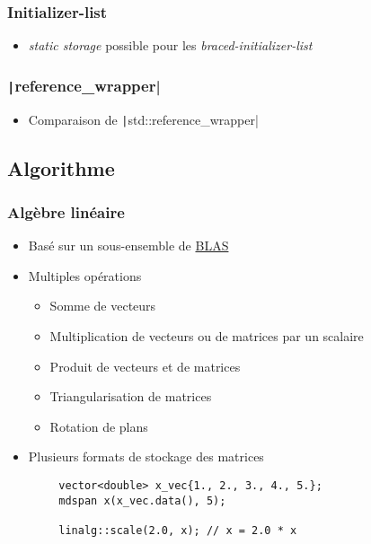 \documentclass[C++.tex]{subfiles}
\begin{document}
\begin{frame}[fragile]
	\frametitle{Initializer-list}
	\begin{itemize}
		\item \textit{static storage} possible pour les \textit{braced-initializer-list}

	\end{itemize}

\end{frame}

\begin{frame}[fragile]
	\frametitle{\texttt|reference_wrapper|}
	\begin{itemize}
		\item Comparaison de \texttt|std::reference_wrapper|
	\end{itemize}

\end{frame}

\subsection*{Algorithme}
\begin{frame}[fragile]
	\frametitle{Algèbre linéaire}
	\begin{itemize}
		\item Basé sur un sous-ensemble de \href{https://www.netlib.org/blas/}{BLAS\linklogo}
		\item Multiples opérations
		\begin{itemize}
			\item Somme de vecteurs
			\item Multiplication de vecteurs ou de matrices par un scalaire
			\item Produit de vecteurs et de matrices
			\item Triangularisation de matrices
			\item Rotation de plans
		\end{itemize}
		\item Plusieurs formats de stockage des matrices
	\end{itemize}

	\begin{verbatim}
		vector<double> x_vec{1., 2., 3., 4., 5.};
		mdspan x(x_vec.data(), 5);

		linalg::scale(2.0, x); // x = 2.0 * x
	\end{verbatim}

\end{frame}
\end{document}
